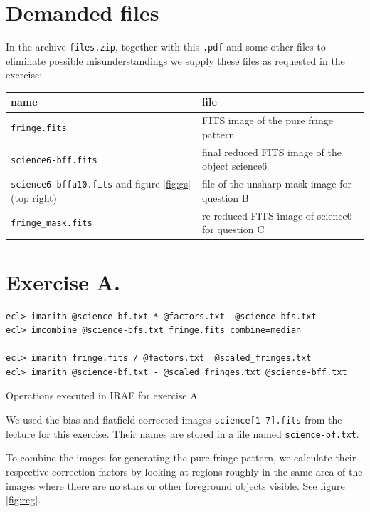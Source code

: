\documentclass[11pt,a4paper,twoside]{article}
\begin{document}
\section*{Demanded files}
In the archive \verb+files.zip+, together with this \verb+.pdf+ and some other
files to eliminate possible misunderstandings we supply these files as
requested in the exercise:
\begin{table}[h!]
\begin{tabular}{p{4cm}l}\toprule
name                        & file         \\ \midrule
\verb+fringe.fits+          & FITS image of the pure fringe pattern \\
\verb+science6-bff.fits+    & final reduced FITS image of the object science6 \\
\verb+science6-bffu10.fits+ 
and figure \ref{fig:gs} 
(top right)                 & file of the unsharp mask image for question B\\
\verb+fringe_mask.fits+     & re-reduced FITS image of science6 for question C	\\
\bottomrule
\end{tabular}
\end{table}

\section*{Exercise A.}

\begin{listing}[h!]
\begin{verbatim}
ecl> imarith @science-bf.txt * @factors.txt  @science-bfs.txt
ecl> imcombine @science-bfs.txt fringe.fits combine=median

ecl> imarith fringe.fits / @factors.txt  @scaled_fringes.txt
ecl> imarith @science-bf.txt - @scaled_fringes.txt @science-bff.txt
\end{verbatim}
\caption{Operations executed in IRAF for exercise A.}
\label{fig:ca}
\end{listing}

We used the bias and flatfield corrected images \verb+science[1-7].fits+ from
the lecture for this exercise. Their names are stored in a file named 
\verb+science-bf.txt+.

To combine the images for generating the pure fringe pattern, we calculate their
respective correction factors by looking at regions roughly in the same area
of the images where there are no stars or other foreground objects visible.
See figure \ref{fig:reg}.
\end{document}
